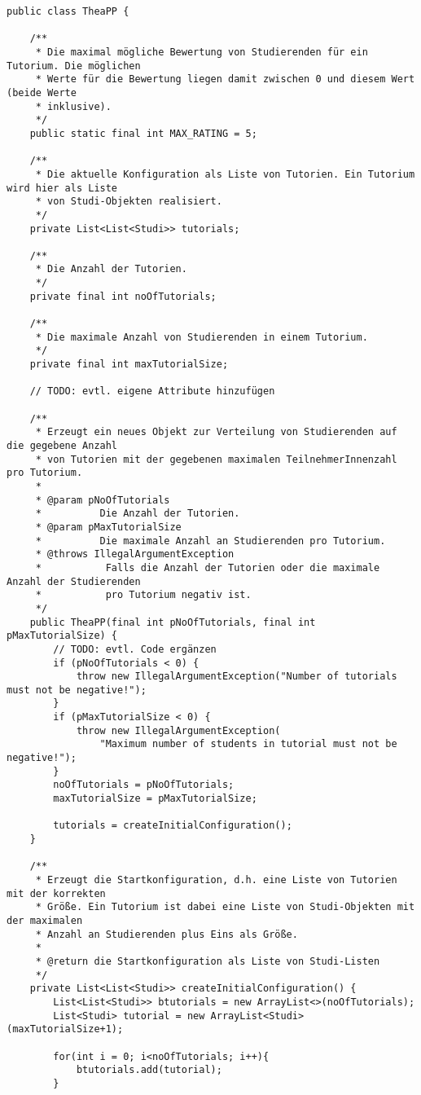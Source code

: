 \documentclass{pi2}
\begin{document}
\begin{lstlisting}
public class TheaPP {

	/**
	 * Die maximal mögliche Bewertung von Studierenden für ein Tutorium. Die möglichen
	 * Werte für die Bewertung liegen damit zwischen 0 und diesem Wert (beide Werte
	 * inklusive).
	 */
	public static final int MAX_RATING = 5;

	/**
	 * Die aktuelle Konfiguration als Liste von Tutorien. Ein Tutorium wird hier als Liste
	 * von Studi-Objekten realisiert.
	 */
	private List<List<Studi>> tutorials;

	/**
	 * Die Anzahl der Tutorien.
	 */
	private final int noOfTutorials;

	/**
	 * Die maximale Anzahl von Studierenden in einem Tutorium.
	 */
	private final int maxTutorialSize;

	// TODO: evtl. eigene Attribute hinzufügen

	/**
	 * Erzeugt ein neues Objekt zur Verteilung von Studierenden auf die gegebene Anzahl
	 * von Tutorien mit der gegebenen maximalen TeilnehmerInnenzahl pro Tutorium.
	 *
	 * @param pNoOfTutorials
	 *          Die Anzahl der Tutorien.
	 * @param pMaxTutorialSize
	 *          Die maximale Anzahl an Studierenden pro Tutorium.
	 * @throws IllegalArgumentException
	 *           Falls die Anzahl der Tutorien oder die maximale Anzahl der Studierenden
	 *           pro Tutorium negativ ist.
	 */
	public TheaPP(final int pNoOfTutorials, final int pMaxTutorialSize) {
		// TODO: evtl. Code ergänzen
		if (pNoOfTutorials < 0) {
			throw new IllegalArgumentException("Number of tutorials must not be negative!");
		}
		if (pMaxTutorialSize < 0) {
			throw new IllegalArgumentException(
				"Maximum number of students in tutorial must not be negative!");
		}
		noOfTutorials = pNoOfTutorials;
		maxTutorialSize = pMaxTutorialSize;

		tutorials = createInitialConfiguration();
	}

	/**
	 * Erzeugt die Startkonfiguration, d.h. eine Liste von Tutorien mit der korrekten
	 * Größe. Ein Tutorium ist dabei eine Liste von Studi-Objekten mit der maximalen
	 * Anzahl an Studierenden plus Eins als Größe.
	 *
	 * @return die Startkonfiguration als Liste von Studi-Listen
	 */
	private List<List<Studi>> createInitialConfiguration() {
		List<List<Studi>> btutorials = new ArrayList<>(noOfTutorials);
		List<Studi> tutorial = new ArrayList<Studi>(maxTutorialSize+1);
		
		for(int i = 0; i<noOfTutorials; i++){
			btutorials.add(tutorial);
		}
		

\end{lstlisting}
\end{document}
